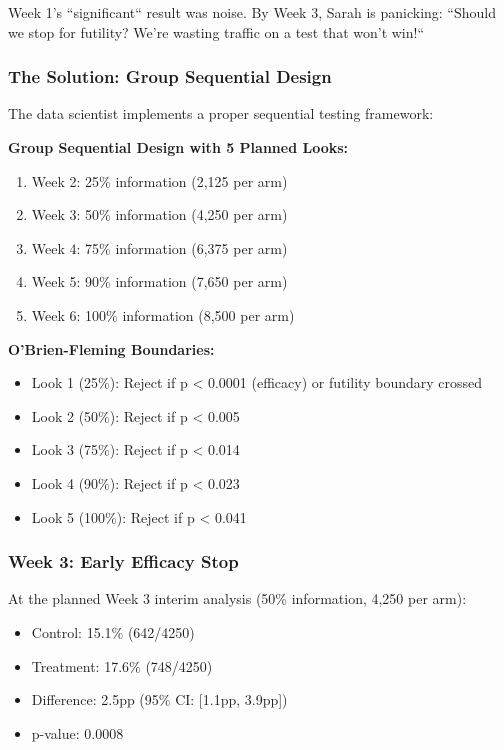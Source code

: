 Week 1's ``significant`` result was noise. By Week 3, Sarah is panicking: ``Should we stop for futility? We're wasting traffic on a test that won't win!``

\subsubsection{The Solution: Group Sequential Design}

The data scientist implements a proper sequential testing framework:

\textbf{Group Sequential Design with 5 Planned Looks:}
\begin{enumerate}
    \item Week 2: 25\% information (2,125 per arm)
    \item Week 3: 50\% information (4,250 per arm)
    \item Week 4: 75\% information (6,375 per arm)
    \item Week 5: 90\% information (7,650 per arm)
    \item Week 6: 100\% information (8,500 per arm)
\end{enumerate}

\textbf{O'Brien-Fleming Boundaries:}
\begin{itemize}
    \item Look 1 (25\%): Reject if p < 0.0001 (efficacy) or futility boundary crossed
    \item Look 2 (50\%): Reject if p < 0.005
    \item Look 3 (75\%): Reject if p < 0.014
    \item Look 4 (90\%): Reject if p < 0.023
    \item Look 5 (100\%): Reject if p < 0.041
\end{itemize}

\subsubsection{Week 3: Early Efficacy Stop}

At the planned Week 3 interim analysis (50\% information, 4,250 per arm):
\begin{itemize}
    \item Control: 15.1\% (642/4250)
    \item Treatment: 17.6\% (748/4250)
    \item Difference: 2.5pp (95\% CI: [1.1pp, 3.9pp])
    \item p-value: 0.0008
\end{itemize}

